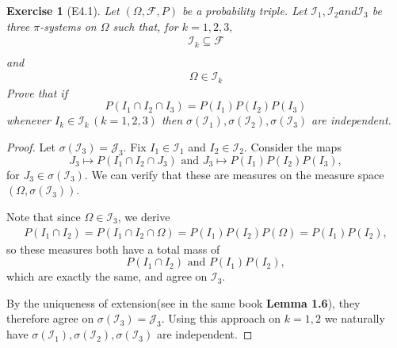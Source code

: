 \documentclass{article}
\newtheorem{exercise}[theorem]{Exercise}
\newcommand{\mcf}{\mathcal{F}}
\newcommand{\mci}{\mathcal{I}}
\newcommand{\mcj}{\mathcal{J}}
\newcommand{\AND}{\mbox{ and }}
\begin{document}
\begin{tcolorbox}
\begin{exercise}[E4.1]\label{E4.1}
    Let $(\Omega, \mcf, P)$ be a probability triple. Let $\mci_1, \mci_2 and \mci_3$ be three $\pi$-systems on $\Omega$ such that, for $k=1,2,3,$
    \begin{align*}
        \mci_k \subseteq \mcf \\
    \end{align*}
    and
    \begin{align*} \label{cond1}
        \Omega \in \mci_k
    \end{align*}
    Prove that if
    \[
        P(I_1 \cap I_2 \cap I_3) = P(I_1) P(I_2) P(I_3)
    \]
    whenever $I_k\in \mci_k \, (k = 1,2,3)$ then $\sigma(\mci_1), \sigma(\mci_2), \sigma(\mci_3)$ are independent.
\end{exercise}
\end{tcolorbox}

\begin{proof}
    Let $\sigma(\mci_3) = \mcj_3$. Fix $I_1 \in \mci_1$ and $I_2 \in \mci_2$. Consider the maps
    \[
        J_3 \mapsto P(I_1\cap I_2 \cap J_3) \AND J_3\mapsto P(I_1)P(I_2)P(I_3),
    \]
    for $J_3 \in \sigma(\mci_3)$. We can verify that these are measures on the measure space $(\Omega, \sigma(\mci_3))$.

    Note that since $\Omega \in \mci_3$, we derive
    \begin{align}\label{eq2}
        P(I_1 \cap I_2) = P(I_1 \cap I_2 \cap \Omega) = P(I_1) P(I_2) P(\Omega) = P(I_1) P(I_2),        
    \end{align}
    so these measures both have a total mass of 
    \[
        P(I_1 \cap I_2) \AND P(I_1)P(I_2),
    \]
    which are exactly the same, and agree on $\mci_3$.

    By the uniqueness of extension(see in the same book \textbf{Lemma 1.6}), they therefore agree on $\sigma(\mci_3) = \mcj_3$.
    Using this approach on $k = 1,2$ we naturally have $\sigma(\mci_1), \sigma(\mci_2), \sigma(\mci_3)$ are independent.
\end{proof}
\end{document}
